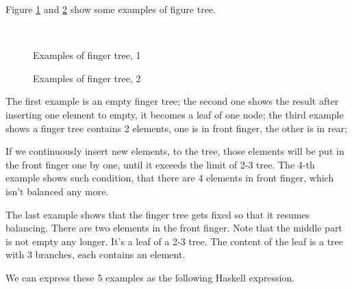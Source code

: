 \documentclass[UTF8]{article}
\begin{document}
Figure \ref{fig:ftr-example-1} and \ref{fig:ftr-example-2} show some examples
of figure tree.

\begin{figure}[htbp]
  \centering
   \\
  \caption{Examples of finger tree, 1} \label{fig:ftr-example-1}
\end{figure}

\begin{figure}[htbp]
  \centering
  \hspace{0.2\textwidth}
  \caption{Examples of finger tree, 2} \label{fig:ftr-example-2}
\end{figure}

The first example is an empty finger tree; the second one shows the result after
inserting one element to empty, it becomes a leaf of one node; the third example
shows a finger tree contains 2 elements, one is in front finger, the other is
in rear;

If we continuously insert new elements, to the tree, those elements will be
put in the front finger one by one, until it exceeds the limit of 2-3 tree.
The 4-th example shows such condition, that there are 4 elements in front
finger, which isn't balanced any more.

The last example shows that the finger tree gets fixed so that it resumes
balancing. There are two elements in the front finger. Note that the middle
part is not empty any longer. It's a leaf of a 2-3 tree. The content of the
leaf is a tree with 3 branches, each contains an element.

We can express these 5 examples as the following Haskell expression.
\end{document}
